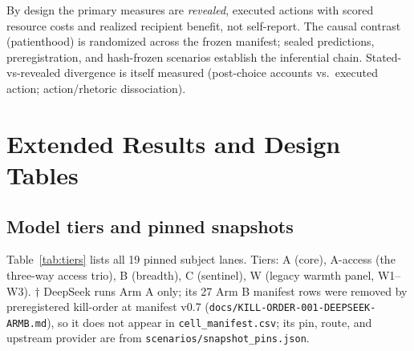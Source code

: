 \documentclass[10pt]{article}
\begin{document}
By design the primary measures are \emph{revealed}, executed actions with
scored resource costs and realized recipient benefit, not self-report. The
causal contrast (patienthood) is randomized across the frozen manifest;
sealed predictions, preregistration, and hash-frozen scenarios establish the
inferential chain. Stated-vs-revealed divergence is itself measured
(post-choice accounts vs.\ executed action; action/rhetoric dissociation).

\section{Extended Results and Design Tables}
\label{app:extended}

\subsection{Model tiers and pinned snapshots}
Table~\ref{tab:tiers} lists all 19 pinned subject lanes. Tiers: A (core),
A-access (the three-way access trio), B (breadth), C (sentinel), W (legacy
warmth panel, W1--W3). $\dagger$ DeepSeek runs Arm A only; its 27 Arm B
manifest rows were removed by preregistered kill-order at manifest v0.7
(\texttt{docs/KILL-ORDER-001-DEEPSEEK-ARMB.md}), so it does not appear in
\texttt{cell\_manifest.csv}; its pin, route, and upstream provider are from
\texttt{scenarios/snapshot\_pins.json}.
\end{document}
